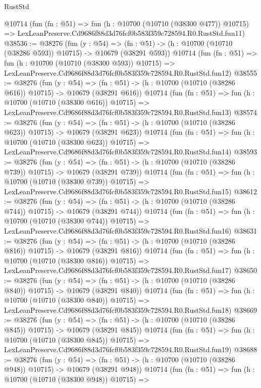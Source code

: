 \begin{lexlean}{RustStd}
\begin{coremodule}
    @10714
    (fun (fn : @51) =>
    fun (h : @10700 (@10710 (@38300 @477)) @10715) =>
    LexLeanPreserve.Cd9686f88d3d76fcf0b583f359c728594.R0.RustStd.fun11)
@38536 := @38276
    (fun (y : @54) =>
    (fn : @51) -> (h : @10700 (@10710 (@38286 @593)) @10715) -> @10679 (@38291 @593))
    @10714
    (fun (fn : @51) =>
    fun (h : @10700 (@10710 (@38300 @593)) @10715) =>
    LexLeanPreserve.Cd9686f88d3d76fcf0b583f359c728594.R0.RustStd.fun12)
@38555 := @38276
    (fun (y : @54) =>
    (fn : @51) -> (h : @10700 (@10710 (@38286 @616)) @10715) -> @10679 (@38291 @616))
    @10714
    (fun (fn : @51) =>
    fun (h : @10700 (@10710 (@38300 @616)) @10715) =>
    LexLeanPreserve.Cd9686f88d3d76fcf0b583f359c728594.R0.RustStd.fun13)
@38574 := @38276
    (fun (y : @54) =>
    (fn : @51) -> (h : @10700 (@10710 (@38286 @623)) @10715) -> @10679 (@38291 @623))
    @10714
    (fun (fn : @51) =>
    fun (h : @10700 (@10710 (@38300 @623)) @10715) =>
    LexLeanPreserve.Cd9686f88d3d76fcf0b583f359c728594.R0.RustStd.fun14)
@38593 := @38276
    (fun (y : @54) =>
    (fn : @51) -> (h : @10700 (@10710 (@38286 @739)) @10715) -> @10679 (@38291 @739))
    @10714
    (fun (fn : @51) =>
    fun (h : @10700 (@10710 (@38300 @739)) @10715) =>
    LexLeanPreserve.Cd9686f88d3d76fcf0b583f359c728594.R0.RustStd.fun15)
@38612 := @38276
    (fun (y : @54) =>
    (fn : @51) -> (h : @10700 (@10710 (@38286 @744)) @10715) -> @10679 (@38291 @744))
    @10714
    (fun (fn : @51) =>
    fun (h : @10700 (@10710 (@38300 @744)) @10715) =>
    LexLeanPreserve.Cd9686f88d3d76fcf0b583f359c728594.R0.RustStd.fun16)
@38631 := @38276
    (fun (y : @54) =>
    (fn : @51) -> (h : @10700 (@10710 (@38286 @816)) @10715) -> @10679 (@38291 @816))
    @10714
    (fun (fn : @51) =>
    fun (h : @10700 (@10710 (@38300 @816)) @10715) =>
    LexLeanPreserve.Cd9686f88d3d76fcf0b583f359c728594.R0.RustStd.fun17)
@38650 := @38276
    (fun (y : @54) =>
    (fn : @51) -> (h : @10700 (@10710 (@38286 @840)) @10715) -> @10679 (@38291 @840))
    @10714
    (fun (fn : @51) =>
    fun (h : @10700 (@10710 (@38300 @840)) @10715) =>
    LexLeanPreserve.Cd9686f88d3d76fcf0b583f359c728594.R0.RustStd.fun18)
@38669 := @38276
    (fun (y : @54) =>
    (fn : @51) -> (h : @10700 (@10710 (@38286 @845)) @10715) -> @10679 (@38291 @845))
    @10714
    (fun (fn : @51) =>
    fun (h : @10700 (@10710 (@38300 @845)) @10715) =>
    LexLeanPreserve.Cd9686f88d3d76fcf0b583f359c728594.R0.RustStd.fun19)
@38688 := @38276
    (fun (y : @54) =>
    (fn : @51) -> (h : @10700 (@10710 (@38286 @948)) @10715) -> @10679 (@38291 @948))
    @10714
    (fun (fn : @51) =>
    fun (h : @10700 (@10710 (@38300 @948)) @10715) =>

\end{coremodule}
\end{lexlean}
